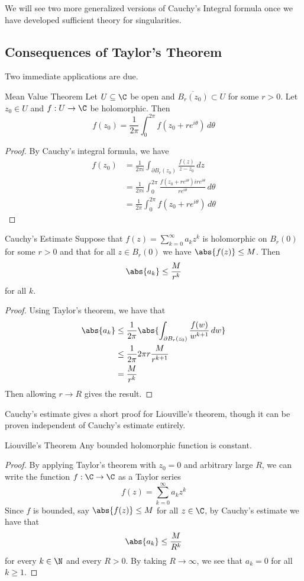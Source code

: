 \documentclass[a4paper]{article}
\begin{document}
We will see two more generalized versions of Cauchy's Integral formula once we have developed sufficient theory for singularities. 

\subsection{Consequences of Taylor's Theorem}
Two immediate applications are due. 

\begin{thm}{Mean Value Theorem}{} Let $U\subseteq\C$ be open and $\overline{B_r(z_0)}\subset U$ for some $r>0$. Let $z_0\in U$ and $f:U\to\C$ be holomorphic. Then $$f(z_0)=\frac{1}{2\pi}\int_0^{2\pi}f(z_0+re^{i\theta})\,d\theta$$ \tcbline
\begin{proof}
By Cauchy's integral formula, we have 
\begin{align*}
f(z_0)&=\frac{1}{2\pi i}\int_{\partial B_r(z_0)}\frac{f(z)}{z-z_0}\,dz\\
&=\frac{1}{2\pi i}\int_0^{2\pi}\frac{f(z_0+re^{i\theta})ire^{i\theta}}{re^{i\theta}}\,d\theta\\
&=\frac{1}{2\pi}\int_0^{2\pi}f(z_0+re^{i\theta})\,d\theta
\end{align*}
\end{proof}
\end{thm}

\begin{crl}{Cauchy's Estimate}{} Suppose that $f(z)=\sum_{k=0}^\infty a_kz^k$ is holomorphic on $B_r(0)$ for some $r>0$ and that for all $z\in B_r(0)$ we have $\abs{f(z)}\leq M$. Then $$\abs{a_k}\leq\frac{M}{r^k}$$ for all $k$. \tcbline
\begin{proof}
Using Taylor's theorem, we have that 
\begin{align*}
\abs{a_k}&\leq\frac{1}{2\pi}\abs{\int_{\partial B_r(z_0)}\frac{f(w)}{w^{k+1}}\,dw}\\
&\leq\frac{1}{2\pi}2\pi r\frac{M}{r^{k+1}}\\
&=\frac{M}{r^k}
\end{align*}
Then allowing $r\to R$ gives the result. 
\end{proof}
\end{crl}

Cauchy's estimate gives a short proof for Liouville's theorem, though it can be proven independent of Cauchy's estimate entirely. 

\begin{crl}{Liouville's Theorem}{} Any bounded holomorphic function is constant. \tcbline
\begin{proof}
By applying Taylor's theorem with $z_0=0$ and arbitrary large $R$, we can write the function $f:\C\to\C$ as a Taylor series $$f(z)=\sum_{k=0}^\infty a_kz^k$$ Since $f$ is bounded, say $\abs{f(z)}\leq M$ for all $z\in\C$, by Cauchy's estimate we have that $$\abs{a_k}\leq\frac{M}{R^k}$$ for every $k\in\N$ and every $R>0$. By taking $R\to\infty$, we see that $a_k=0$ for all $k\geq 1$. 
\end{proof}
\end{crl}
\end{document}
